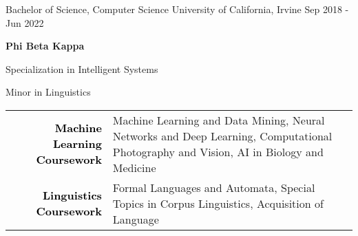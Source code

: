 

\begin{cventries}
  \cventry
    {Bachelor of Science, Computer Science} %
    {University of California, Irvine} %
    {} %
    {Sep 2018 - Jun 2022} %
    {
      \begin {cvitems}
        \item{\textbf{Phi Beta Kappa}}
        \item{Specialization in Intelligent Systems}
        \item{Minor in Linguistics}
      \end{cvitems}
    }
\end{cventries}


\noindent
\begin{tabularx}{\textwidth}{r  X  l | }
    \textbf{\textcolor{black}{Machine Learning Coursework}} & Machine Learning and Data Mining, Neural Networks and Deep Learning, \newline Computational Photography and Vision, AI in Biology and Medicine
\\
   \textbf{\textcolor{black}{Linguistics Coursework}} &  \noindent\parbox[t]{\hsize}{Formal Languages and Automata, Special Topics in Corpus Linguistics, \newline Acquisition of Language} \\
\end{tabularx}

